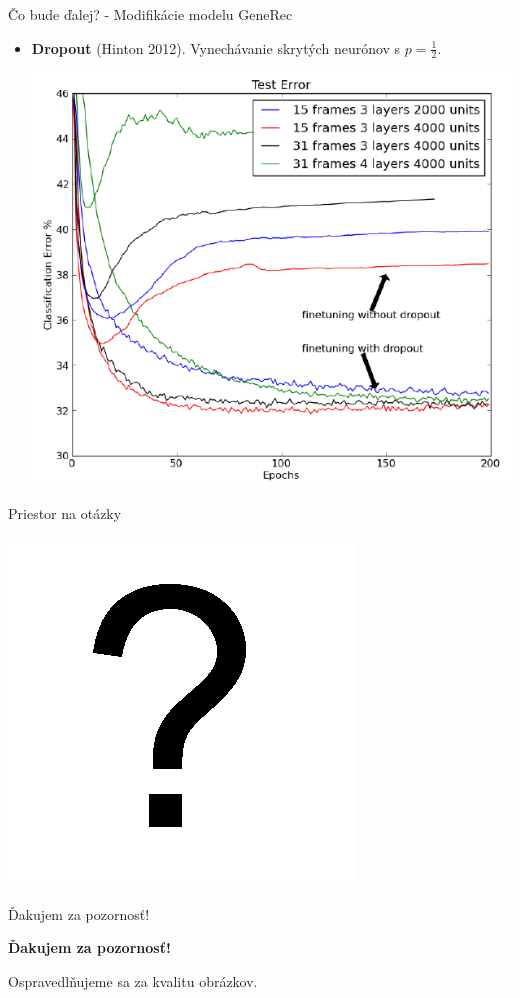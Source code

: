 \documentclass[xcolor=dvipsnames]{beamer}
\begin{document}
\begin{frame}{Čo bude ďalej? - Modifikácie modelu GeneRec}
  \begin{itemize}
    \item \textbf{Dropout} (Hinton 2012). Vynechávanie skrytých neurónov s $p=\frac{1}{2}$. 
    \begin{center}
      \includegraphics[scale=0.4]{img/dropout.png}
    \end{center}
  \end{itemize}
\end{frame}

\begin{frame}{Priestor na otázky}
  \begin{center}
  \includegraphics[scale=0.75]{img/question.png}
  \end{center}
\end{frame}

\begin{frame}{Ďakujem za pozornosť!}
  \begin{center}
{\bf Ďakujem za pozornosť!} 
  \end{center}
  
  \vspace{3cm}
  
  \begin{center}
  \small{Ospravedlňujeme sa za kvalitu obrázkov.}
  \end{center}
\end{frame}
\end{document}
